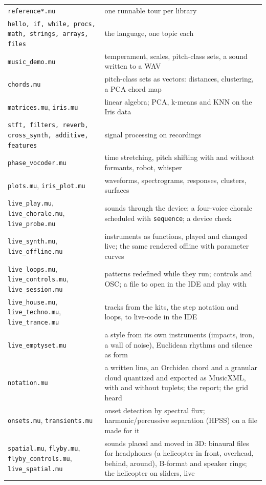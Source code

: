 \documentclass[11pt,a4paper]{article}
\newcommand{\musil}[1]{\lstinline[style=musilinline]{#1}}
\begin{document}
\begin{center}
\begin{tabular}{@{}ll@{}}
\toprule
\texttt{reference*.mu} & one runnable tour per library \\
\texttt{hello, if, while, procs, math, strings, arrays, files} & the language, one topic each \\
\texttt{music\_demo.mu} & temperament, scales, pitch-class sets, a sound written to a WAV \\
\texttt{chords.mu} & pitch-class sets as vectors: distances, clustering, a PCA chord map \\
\texttt{matrices.mu}, \texttt{iris.mu} & linear algebra; PCA, k-means and KNN on the Iris data \\
\texttt{stft, filters, reverb, cross\_synth, additive, features} & signal processing on recordings \\
\texttt{phase\_vocoder.mu} & time stretching, pitch shifting with and without formants, robot, whisper \\
\texttt{plots.mu}, \texttt{iris\_plot.mu} & waveforms, spectrograms, responses, clusters, surfaces \\
\texttt{live\_play.mu}, \texttt{live\_chorale.mu}, \texttt{live\_probe.mu} & sounds through the device; a four-voice chorale scheduled with \musil{sequence}; a device check \\
\texttt{live\_synth.mu}, \texttt{live\_offline.mu} & instruments as functions, played and changed live; the same rendered offline with parameter curves \\
\texttt{live\_loops.mu}, \texttt{live\_controls.mu}, \texttt{live\_session.mu} & patterns redefined while they run; controls and OSC; a file to open in the IDE and play with \\
\texttt{live\_house.mu}, \texttt{live\_techno.mu}, \texttt{live\_trance.mu} & tracks from the kits, the step notation and loops, to live-code in the IDE \\
\texttt{live\_emptyset.mu} & a style from its own instruments (impacts, iron, a wall of noise), Euclidean rhythms and silence as form \\
\texttt{notation.mu} & a written line, an Orchidea chord and a granular cloud quantized and exported as MusicXML, with and without tuplets; the report; the grid heard \\
\texttt{onsets.mu}, \texttt{transients.mu} & onset detection by spectral flux; harmonic/percussive separation (HPSS) on a file made for it \\
\texttt{spatial.mu}, \texttt{flyby.mu}, \texttt{flyby\_controls.mu}, \texttt{live\_spatial.mu} & sounds placed and moved in 3D: binaural files for headphones (a helicopter in front, overhead, behind, around), B-format and speaker rings; the helicopter on sliders, live \\

\end{tabular}
\end{center}
\end{document}
